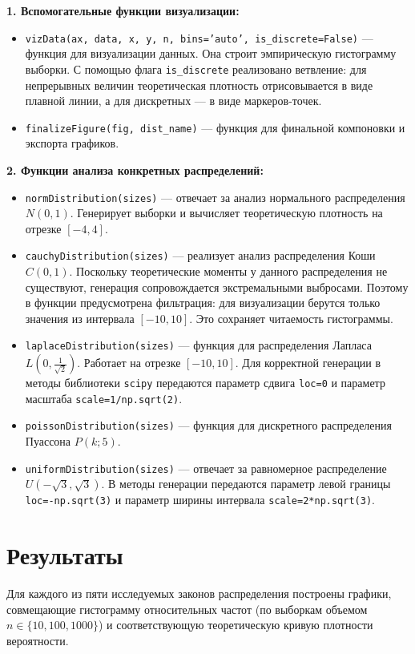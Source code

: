 \documentclass[a4paper, 14pt]{extarticle}
\begin{document}
\textbf{1. Вспомогательные функции визуализации:}
\begin{itemize}
    \item \texttt{vizData(ax, data, x, y, n, bins='auto', is\_discrete=False)} — функция для визуализации данных. Она строит эмпирическую гистограмму выборки. С помощью флага \texttt{is\_discrete} реализовано ветвление: для непрерывных величин теоретическая плотность отрисовывается в виде плавной линии, а для дискретных — в виде маркеров-точек.
    \item \texttt{finalizeFigure(fig, dist\_name)} — функция для финальной компоновки и экспорта графиков.
\end{itemize}

\textbf{2. Функции анализа конкретных распределений:}
\begin{itemize}
    \item \texttt{normDistribution(sizes)} --- отвечает за анализ нормального распределения $N(0,1)$. Генерирует выборки и вычисляет теоретическую плотность на отрезке $[-4,4]$.
    \item \texttt{cauchyDistribution(sizes)} --- реализует анализ распределения Коши $C(0,1)$. Поскольку теоретические моменты у данного распределения не существуют, генерация сопровождается экстремальными выбросами. Поэтому в функции предусмотрена фильтрация: для визуализации берутся только значения из интервала $[-10,10]$. Это сохраняет читаемость гистограммы.
    \item \texttt{laplaceDistribution(sizes)} --- функция для распределения Лапласа $L(0,\frac{1}{\sqrt{2}})$. Работает на отрезке $[-10,10]$. Для корректной генерации в методы библиотеки \texttt{scipy} передаются параметр сдвига \texttt{loc=0} и параметр масштаба \texttt{scale=1/np.sqrt(2)}.
    \item \texttt{poissonDistribution(sizes)} --- функция для дискретного распределения Пуассона $P(k;5)$.
    \item \texttt{uniformDistribution(sizes)} --- отвечает за равномерное распределение $U(-\sqrt{3},\sqrt{3})$. В методы генерации передаются параметр левой границы \texttt{loc=-np.sqrt(3)} и параметр ширины интервала \texttt{scale=2*np.sqrt(3)}.
\end{itemize}

\section{Результаты}
Для каждого из пяти исследуемых законов распределения построены графики, совмещающие гистограмму относительных частот (по выборкам объемом $n \in \{10, 100, 1000\}$) и соответствующую теоретическую кривую плотности вероятности.
\end{document}

